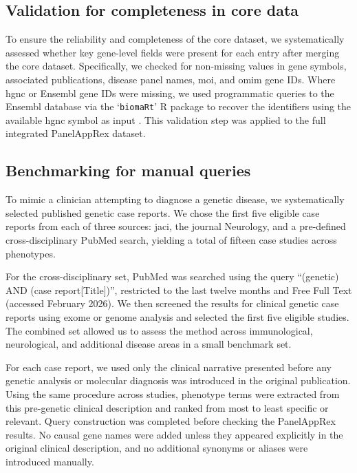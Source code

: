 \subsection{Validation for completeness in core data}
\noindent
To ensure the reliability and completeness of the core dataset, we systematically assessed whether key gene-level fields were present for each entry after merging the core dataset.
Specifically, we checked for non-missing values in gene symbols, associated publications, disease panel names, \ac{moi}, and \ac{omim} gene IDs. 
Where \ac{hgnc} or Ensembl gene IDs were missing, we used programmatic queries to the Ensembl database via the `\texttt{biomaRt}' R package to recover the identifiers using the available \ac{hgnc} symbol as input \cite{steffen_durinck_biomart}. 
This validation step was applied to the full integrated PanelAppRex dataset.

\subsection{Benchmarking for manual queries}
\noindent
To mimic a clinician attempting to diagnose a genetic disease, we systematically selected published genetic case reports. We chose the first five eligible case reports from each of three sources: \ac{jaci}, the journal Neurology, and a pre-defined cross-disciplinary PubMed search, yielding a total of fifteen case studies across phenotypes.

For the cross-disciplinary set, PubMed was searched using the query ``(genetic) AND (case report[Title])'', restricted to the last twelve months and Free Full Text (accessed February 2026). We then screened the results for clinical genetic case reports using exome or genome analysis and selected the first five eligible studies. The combined set allowed us to assess the method across immunological, neurological, and additional disease areas in a small benchmark set.

For each case report, we used only the clinical narrative presented before any genetic analysis or molecular diagnosis was introduced in the original publication. Using the same procedure across studies, phenotype terms were extracted from this pre-genetic clinical description and ranked from most to least specific or relevant. Query construction was completed before checking the PanelAppRex results. No causal gene names were added unless they appeared explicitly in the original clinical description, and no additional synonyms or aliases were introduced manually.

